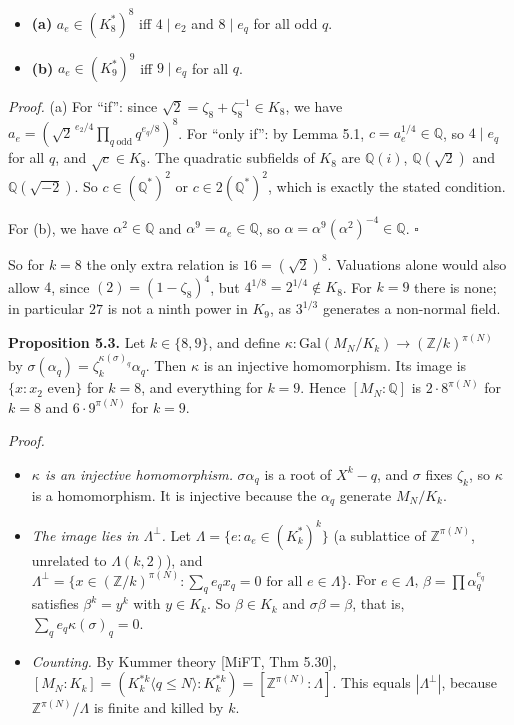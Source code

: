 \documentclass[
]{amsart}
\providecommand{\tightlist}{%
  \setlength{\itemsep}{0pt}\setlength{\parskip}{0pt}}
\begin{document}
\begin{itemize}
\tightlist
\item
  \textbf{(a)} \(a_e\in(K_8^*)^8\) iff \(4\mid e_2\) and \(8\mid e_q\)
  for all odd \(q\).
\item
  \textbf{(b)} \(a_e\in(K_9^*)^9\) iff \(9\mid e_q\) for all \(q\).
\end{itemize}

\emph{Proof.} (a) For ``if'': since
\(\sqrt{2}=\zeta_8+\zeta_8^{-1}\in K_8\), we have
\(a_e=(\sqrt{2}^{\,e_2/4}\prod_{q\ \mathrm{odd}}q^{e_q/8})^8\). For
``only if'': by Lemma 5.1, \(c=a_e^{1/4}\in\mathbb{Q}\), so
\(4\mid e_q\) for all \(q\), and \(\sqrt{c}\in K_8\). The quadratic
subfields of \(K_8\) are \(\mathbb{Q}(i)\), \(\mathbb{Q}(\sqrt{2})\) and
\(\mathbb{Q}(\sqrt{-2})\). So \(c\in(\mathbb{Q}^*)^2\) or
\(c\in2(\mathbb{Q}^*)^2\), which is exactly the stated condition.

For (b), we have \(\alpha^2\in\mathbb{Q}\) and
\(\alpha^9=a_e\in\mathbb{Q}\), so
\(\alpha=\alpha^9(\alpha^2)^{-4}\in\mathbb{Q}\). \(\square\)

So for \(k=8\) the only extra relation is \(16=(\sqrt{2})^8\).
Valuations alone would also allow \(4\), since \((2)=(1-\zeta_8)^4\),
but \(4^{1/8}=2^{1/4}\notin K_8\). For \(k=9\) there is none; in
particular \(27\) is not a ninth power in \(K_9\), as \(3^{1/3}\)
generates a non-normal field.

\textbf{Proposition 5.3.} Let \(k\in\{8,9\}\), and define
\(\kappa:\mathrm{Gal}(M_N/K_k)\to(\mathbb{Z}/k)^{\pi(N)}\) by
\(\sigma(\alpha_q)=\zeta_k^{\kappa(\sigma)_q}\alpha_q\). Then \(\kappa\)
is an injective homomorphism. Its image is \(\{x:x_2\text{ even}\}\) for
\(k=8\), and everything for \(k=9\). Hence \([M_N:\mathbb{Q}]\) is
\(2\cdot8^{\pi(N)}\) for \(k=8\) and \(6\cdot9^{\pi(N)}\) for \(k=9\).

\emph{Proof.}

\begin{itemize}
\tightlist
\item
  \emph{\(\kappa\) is an injective homomorphism.} \(\sigma\alpha_q\) is
  a root of \(X^k-q\), and \(\sigma\) fixes \(\zeta_k\), so \(\kappa\)
  is a homomorphism. It is injective because the \(\alpha_q\) generate
  \(M_N/K_k\).
\item
  \emph{The image lies in \(\Lambda^\perp\).} Let
  \(\Lambda=\{e:a_e\in(K_k^*)^k\}\) (a sublattice of
  \(\mathbb{Z}^{\pi(N)}\), unrelated to \(\Lambda(k,2)\)), and
  \(\Lambda^\perp=\{x\in(\mathbb{Z}/k)^{\pi(N)}:\sum_qe_qx_q=0\text{ for all }e\in\Lambda\}\).
  For \(e\in\Lambda\), \(\beta=\prod\alpha_q^{e_q}\) satisfies
  \(\beta^k=y^k\) with \(y\in K_k\). So \(\beta\in K_k\) and
  \(\sigma\beta=\beta\), that is, \(\sum_qe_q\kappa(\sigma)_q=0\).
\item
  \emph{Counting.} By Kummer theory {[}MiFT, Thm 5.30{]},
  \([M_N:K_k]=(K_k^{*k}\langle q\le N\rangle:K_k^{*k})=[\mathbb{Z}^{\pi(N)}:\Lambda]\).
  This equals \(|\Lambda^\perp|\), because
  \(\mathbb{Z}^{\pi(N)}/\Lambda\) is finite and killed by \(k\).
\end{itemize}
\end{document}
